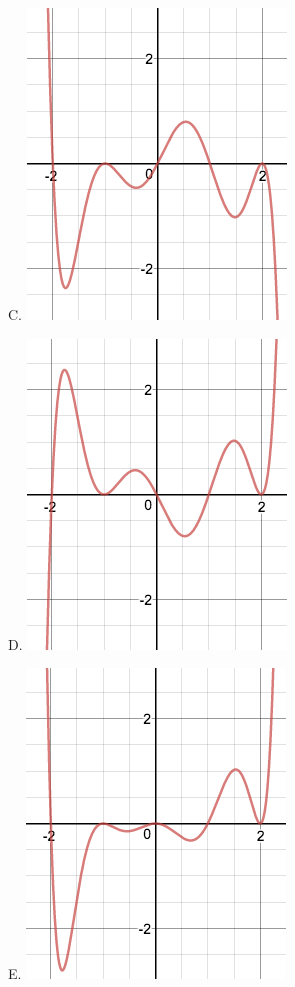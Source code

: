 \documentclass{ximera}
\begin{document}
\begin{question}
\begin{center}
\begin{expandable}
\begin{expandable}
\begin{multicols}{3}
\begin{center}
C. \includegraphics[scale=0.25]{Graph3}
\end{center}
\end{multicols}

\begin{multicols}{3}
\begin{center}
D. \includegraphics[scale=0.25]{Graph4}
\end{center}

\begin{center}
E. \includegraphics[scale=0.25]{Graph5} %
\end{center} 


\end{multicols}
\end{expandable}
\end{expandable}
\end{center}
\end{question}
\end{document}
